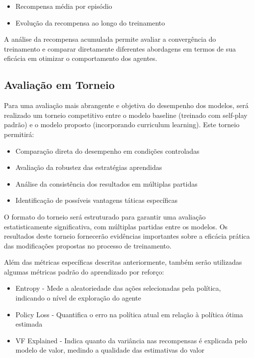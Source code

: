 \begin{itemize}
    \item Recompensa média por episódio
    \item Evolução da recompensa ao longo do treinamento
\end{itemize}

A análise da recompensa acumulada permite avaliar a convergência do treinamento e comparar diretamente diferentes abordagens em termos de sua eficácia em otimizar o comportamento dos agentes.

\subsection{Avaliação em Torneio}

Para uma avaliação mais abrangente e objetiva do desempenho dos modelos, será realizado um torneio competitivo entre o modelo baseline (treinado com self-play padrão) e o modelo proposto (incorporando curriculum learning). Este torneio permitirá:

\begin{itemize}
    \item Comparação direta do desempenho em condições controladas
    \item Avaliação da robustez das estratégias aprendidas
    \item Análise da consistência dos resultados em múltiplas partidas
    \item Identificação de possíveis vantagens táticas específicas
\end{itemize}

O formato do torneio será estruturado para garantir uma avaliação estatisticamente significativa, com múltiplas partidas entre os modelos. Os resultados deste torneio fornecerão evidências importantes sobre a eficácia prática das modificações propostas no processo de treinamento.


Além das métricas específicas descritas anteriormente, também serão utilizadas algumas métricas padrão do aprendizado por reforço:

\begin{itemize}
    \item Entropy - Mede a aleatoriedade das ações selecionadas pela política, indicando o nível de exploração do agente
    \item Policy Loss - Quantifica o erro na política atual em relação à política ótima estimada
    \item VF Explained - Indica quanto da variância nas recompensas é explicada pelo modelo de valor, medindo a qualidade das estimativas do valor
\end{itemize}


